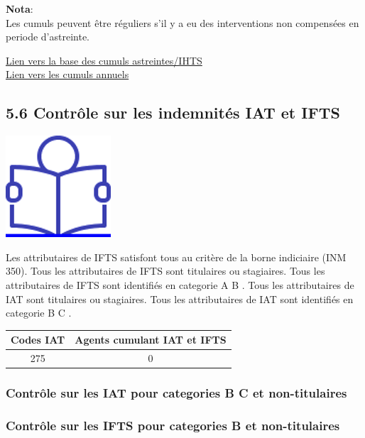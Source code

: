 \textbf{Nota}:\\
Les cumuls peuvent être réguliers s'il y a eu des interventions non
compensées en periode d'astreinte.

\href{../Bases/Reglementation/Controle_astreintes_HS_irreg.csv}{Lien vers
la base des cumuls astreintes/IHTS}\\
\href{../Bases/Reglementation/Cum_astreintes_HS_irreg.csv}{Lien vers les
cumuls annuels}

\hypertarget{controle-sur-les-indemnites-iat-et-ifts}{%
\subsection{5.6 Contrôle sur les indemnités IAT et
IFTS}\label{controle-sur-les-indemnites-iat-et-ifts}}

\href{../Docs/Notices/fiche_IAT_IFTS.odt}{\includegraphics{icones/Notice.png}}

Les attributaires de IFTS satisfont tous au critère de la borne
indiciaire (INM 350). Tous les attributaires de IFTS sont titulaires ou
stagiaires. Tous les attributaires de IFTS sont identifiés en categorie
A B . Tous les attributaires de IAT sont titulaires ou stagiaires. Tous
les attributaires de IAT sont identifiés en categorie B C .

\begin{longtable}[]{@{}cc@{}}
\toprule
Codes IAT & Agents cumulant IAT et IFTS\tabularnewline
\midrule
\endhead
275 & 0\tabularnewline
\bottomrule
\end{longtable}

\hypertarget{controle-sur-les-iat-pour-categories-b-c-et-non-titulaires}{%
\subsubsection{Contrôle sur les IAT pour categories B C et
non-titulaires}\label{controle-sur-les-iat-pour-categories-b-c-et-non-titulaires}}

\hypertarget{controle-sur-les-ifts-pour-categories-b-et-non-titulaires}{%
\subsubsection{Contrôle sur les IFTS pour categories B et
non-titulaires}\label{controle-sur-les-ifts-pour-categories-b-et-non-titulaires}}

